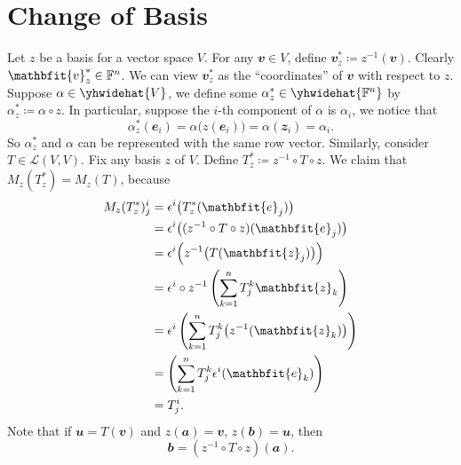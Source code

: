 \documentclass[math, code]{amznotes}
\theoremstyle{remark}
\begin{document}
\section{Change of Basis}\label{sectionChangeBasis}
Let $z$ be a basis for a vector space $V$. For any $\mathbfit{v} \in V$, define $\mathbfit{v}^*_z \coloneqq z^{-1}(\mathbfit{v})$. Clearly $\mathbfit{v}^*_z \in \F^n$. We can view $\mathbfit{v}^*_z$ as the ``coordinates'' of $\mathbfit{v}$ with respect to $z$. Suppose $\alpha \in \yhwidehat{V}$, we define some $\alpha^*_z \in \yhwidehat{\F^n}$ by $\alpha^*_z \coloneqq \alpha \circ z$. In particular, suppose the $i$-th component of $\alpha$ is $\alpha_i$, we notice that
\begin{equation*}
    \alpha^*_z(\mathbfit{e}_i) = \alpha\bigl(z(\mathbfit{e}_i)\bigr) = \alpha(\mathbfit{z}_i) = \alpha_i.
\end{equation*}
So $\alpha^*_z$ and $\alpha$ can be represented with the same row vector. Similarly, consider $T \in \mathcal{L}(V, V)$. Fix any basis $z$ of $V$. Define $T^*_z \coloneqq z^{-1} \circ T \circ z$. We claim that $M_z(T^*_z) = M_z(T)$, because
\begin{align*}
    M_z(T^*_z)^i_j & = \epsilon^i\bigl(T^*_z(\mathbfit{e}_j)\bigr) \\
    & = \epsilon^i\bigl((z^{-1} \circ T \circ z)(\mathbfit{e}_j)\bigr) \\
    & = \epsilon^i\Bigl(z^{-1}\bigl(T(\mathbfit{z}_j)\bigr)\Bigr) \\
    & = \epsilon^i \circ z^{-1}\left(\sum_{k = 1}^{n}T^k_j\mathbfit{z}_k\right) \\
    & = \epsilon^i\left(\sum_{k = 1}^{n}T^k_j\bigl(z^{-1}(\mathbfit{z}_k)\bigr)\right) \\
    & = \left(\sum_{k = 1}^{n}T^k_j\epsilon^i(\mathbfit{e}_k)\right) \\
    & = T^i_j.
\end{align*}
Note that if $\mathbfit{u} = T(\mathbfit{v})$ and $z(\mathbfit{a}) = \mathbfit{v}$, $z(\mathbfit{b}) = \mathbfit{u}$, then 
\begin{equation*}
    \mathbfit{b} = \left(z^{-1} \circ T \circ z\right)(\mathbfit{a}).
\end{equation*}
\end{document}
